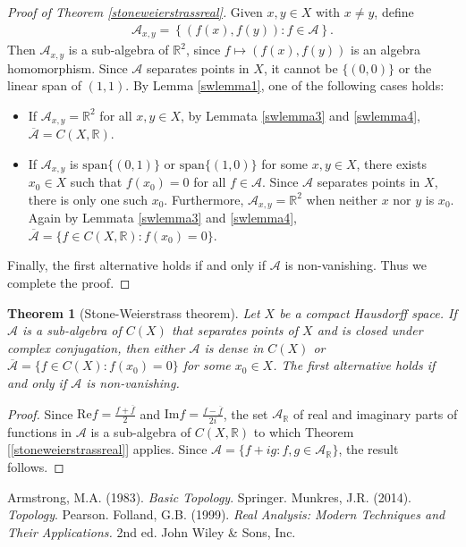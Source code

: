 \documentclass{article}
\numberwithin{equation}{section}
\newcommand{\bbR}{\mathbb{R}}
\renewcommand{\cal}{\mathcal}
\newcommand{\ol}{\overline}
\renewcommand{\Re}{\mathrm{Re}}
\renewcommand{\Im}{\mathrm{Im}}
\theoremstyle{plain}
\newtheorem{theorem}{Theorem}[section]
\theoremstyle{definition}
\begin{document}
\begin{proof}[Proof of Theorem \ref{stoneweierstrassreal}]
Given $x,y\in X$ with $x\neq y$, define
\begin{align*}
	\cal{A}_{x,y}=\left\{(f(x),f(y)):f\in\cal{A}\right\}.
\end{align*}
Then $\cal{A}_{x,y}$ is a sub-algebra of $\bbR^2$, since $f\mapsto(f(x),f(y))$ is an algebra homomorphism. Since $\cal{A}$ separates points in $X$, it cannot be $\{(0,0)\}$ or the linear span of $(1,1)$. By Lemma \ref{swlemma1}, one of the following cases holds:
\begin{itemize}
	\item If $\cal{A}_{x,y}=\bbR^2$ for all $x,y\in X$, by Lemmata \ref{swlemma3} and \ref{swlemma4}, $\ol{\cal{A}}=C(X,\bbR)$.
	\item If $\cal{A}_{x,y}$ is $\mathrm{span}\{(0,1)\}$ or $\mathrm{span}\{(1,0)\}$ for some $x,y\in X$, there exists $x_0\in X$ such that $f(x_0)=0$ for all $f\in\cal{A}$. Since $\cal{A}$ separates points in $X$, there is only one such $x_0$. Furthermore, $\cal{A}_{x,y}=\bbR^2$ when neither $x$ nor $y$ is $x_0$. Again by Lemmata \ref{swlemma3} and \ref{swlemma4}, $\ol{\cal{A}}=\{f\in C(X,\bbR):f(x_0)=0\}$.
\end{itemize}
Finally, the first alternative holds if and only if $\cal{A}$ is non-vanishing. Thus we complete the proof.
\end{proof}

\begin{theorem}[Stone-Weierstrass theorem]\label{stoneweierstrasscomplex}
Let $X$ be a compact Hausdorff space. If $\cal{A}$ is a sub-algebra of $C(X)$ that separates points of $X$ and is closed under complex conjugation, then either $\cal{A}$ is dense in $C(X)$ or $\ol{\cal{A}}=\{f\in C(X):f(x_0)=0\}$ for some $x_0\in X$. The first alternative holds if and only if $\cal{A}$ is non-vanishing.
\end{theorem}
\begin{proof}
Since $\Re f=\frac{f+\ol{f}}{2}$ and $\Im f=\frac{f-\ol{f}}{2i}$, the set $\cal{A}_{\bbR}$ of real and imaginary parts of functions in $\cal{A}$ is a sub-algebra of $C(X,\bbR)$ to which Theorem [\ref{stoneweierstrassreal}] applies. Since $\cal{A}=\{f+ig:f,g\in\cal{A}_{\bbR}\}$, the result follows.
\end{proof}


\newpage
\begin{thebibliography}{99}
 Armstrong, M.A. (1983). \textit{Basic Topology}. Springer.
 Munkres, J.R. (2014). \textit{Topology}. Pearson. 
 Folland, G.B. (1999). \textit{Real Analysis: Modern Techniques and Their Applications.} 2nd ed. John Wiley \& Sons, Inc.
\end{thebibliography}
\end{document}
